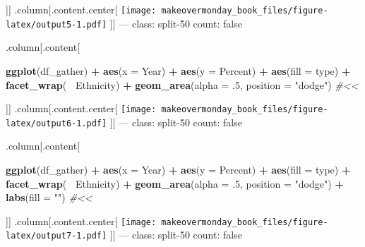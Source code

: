 \documentclass[]{book}
\newenvironment{Shaded}{\begin{snugshade}}{\end{snugshade}}
\newcommand{\KeywordTok}[1]{\textcolor[rgb]{0.13,0.29,0.53}{\textbf{#1}}}
\newcommand{\DataTypeTok}[1]{\textcolor[rgb]{0.13,0.29,0.53}{#1}}
\newcommand{\DecValTok}[1]{\textcolor[rgb]{0.00,0.00,0.81}{#1}}
\newcommand{\StringTok}[1]{\textcolor[rgb]{0.31,0.60,0.02}{#1}}
\newcommand{\CommentTok}[1]{\textcolor[rgb]{0.56,0.35,0.01}{\textit{#1}}}
\newcommand{\OperatorTok}[1]{\textcolor[rgb]{0.81,0.36,0.00}{\textbf{#1}}}
\newcommand{\NormalTok}[1]{#1}
\theoremstyle{definition}
\theoremstyle{definition}
\theoremstyle{definition}
\theoremstyle{remark}
\begin{document}
{]}{]} .column{[}.content.center{[}
\texttt{[image: makeovermonday\_book\_files/figure-latex/output5-1.pdf]}
{]}{]} --- class: split-50 count: false

.column{[}.content{[}

\begin{Shaded}
\begin{Highlighting}[]
\KeywordTok{ggplot}\NormalTok{(df_gather) }\OperatorTok{+}
\StringTok{  }\KeywordTok{aes}\NormalTok{(}\DataTypeTok{x =}\NormalTok{ Year) }\OperatorTok{+}
\StringTok{  }\KeywordTok{aes}\NormalTok{(}\DataTypeTok{y =}\NormalTok{ Percent) }\OperatorTok{+}
\StringTok{  }\KeywordTok{aes}\NormalTok{(}\DataTypeTok{fill =}\NormalTok{ type) }\OperatorTok{+}
\StringTok{  }\KeywordTok{facet_wrap}\NormalTok{(}\OperatorTok{~}\StringTok{ }\NormalTok{Ethnicity) }\OperatorTok{+}
\StringTok{  }\KeywordTok{geom_area}\NormalTok{(}\DataTypeTok{alpha =}\NormalTok{ .}\DecValTok{5}\NormalTok{, }\DataTypeTok{position =} \StringTok{"dodge"}\NormalTok{)  }\CommentTok{#<<}
\end{Highlighting}
\end{Shaded}

{]}{]} .column{[}.content.center{[}
\texttt{[image: makeovermonday\_book\_files/figure-latex/output6-1.pdf]}
{]}{]} --- class: split-50 count: false

.column{[}.content{[}

\begin{Shaded}
\begin{Highlighting}[]
\KeywordTok{ggplot}\NormalTok{(df_gather) }\OperatorTok{+}
\StringTok{  }\KeywordTok{aes}\NormalTok{(}\DataTypeTok{x =}\NormalTok{ Year) }\OperatorTok{+}
\StringTok{  }\KeywordTok{aes}\NormalTok{(}\DataTypeTok{y =}\NormalTok{ Percent) }\OperatorTok{+}
\StringTok{  }\KeywordTok{aes}\NormalTok{(}\DataTypeTok{fill =}\NormalTok{ type) }\OperatorTok{+}
\StringTok{  }\KeywordTok{facet_wrap}\NormalTok{(}\OperatorTok{~}\StringTok{ }\NormalTok{Ethnicity) }\OperatorTok{+}
\StringTok{  }\KeywordTok{geom_area}\NormalTok{(}\DataTypeTok{alpha =}\NormalTok{ .}\DecValTok{5}\NormalTok{, }\DataTypeTok{position =} \StringTok{"dodge"}\NormalTok{) }\OperatorTok{+}
\StringTok{  }\KeywordTok{labs}\NormalTok{(}\DataTypeTok{fill =} \StringTok{""}\NormalTok{)  }\CommentTok{#<<}
\end{Highlighting}
\end{Shaded}

{]}{]} .column{[}.content.center{[}
\texttt{[image: makeovermonday\_book\_files/figure-latex/output7-1.pdf]}
{]}{]} --- class: split-50 count: false
\end{document}
